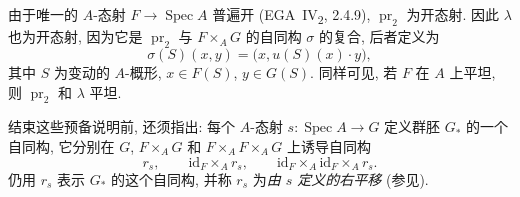 由于唯一的 \(A\)-态射 \(F\to\operatorname{Spec}A\) 普遍开
(EGA~IV\textsubscript{2}, 2.4.9), \(\operatorname{pr}_2\) 为开态射.
因此 \(\lambda\) 也为开态射, 因为它是 \(\operatorname{pr}_2\)
与 \(F\times_A G\) 的自同构 \(\sigma\) 的复合, 后者定义为
\[
  \sigma(S)(x,y)=\bigl(x,u(S)(x)\cdot y\bigr),
\]
其中 \(S\) 为变动的 \(A\)-概形, \(x\in F(S)\), \(y\in G(S)\).
同样可见, 若 \(F\) 在 \(A\) 上平坦, 则 \(\operatorname{pr}_2\) 和 \(\lambda\) 平坦.

结束这些预备说明前, 还须指出: 每个 \(A\)-态射
\(s:\operatorname{Spec}A\to G\) 定义群胚 \(G_*\) 的一个自同构,
它分别在 \(G\), \(F\times_A G\) 和 \(F\times_A F\times_A G\) 上诱导自同构
\[
  r_s,\qquad
  \mathrm{id}_F\times_A r_s,\qquad
  \mathrm{id}_F\times_A\mathrm{id}_F\times_A r_s.
\]
仍用 \(r_s\) 表示 \(G_*\) 的这个自同构,
并称 \(r_s\) 为\emph{由 \(s\) 定义的右平移}
(参见).

